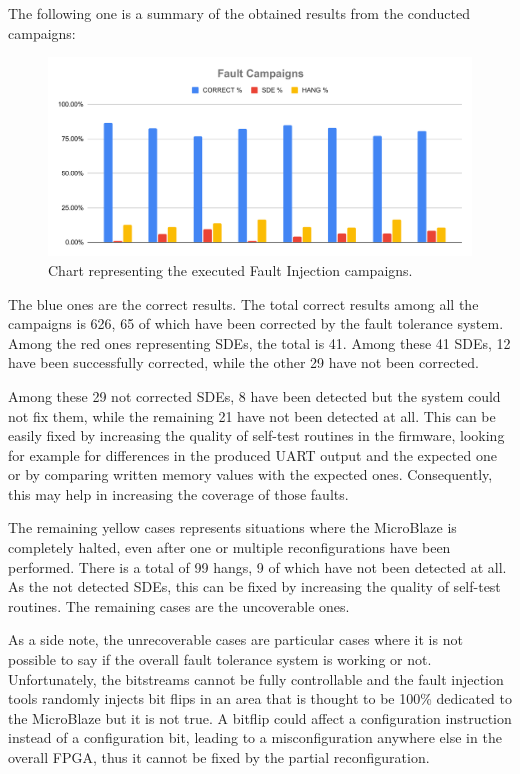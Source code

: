 The following one is a summary of the obtained results from the conducted campaigns:

\begin{figure}[H]
\centering
\includegraphics[width=0.95\linewidth]{images/chapter5/chart.pdf}
\caption{Chart representing the executed Fault Injection campaigns.}
\end{figure}

The blue ones are the correct results. The total correct results among all the campaigns is 626, 65 of which have been corrected by the fault tolerance system. Among the red ones representing SDEs, the total is 41. Among these 41 SDEs, 12 have been successfully corrected, while the other 29 have not been corrected.\bigskip

Among these 29 not corrected SDEs, 8 have been detected but the system could not fix them, while the remaining 21 have not been detected at all. This can be easily fixed by increasing the quality of self-test routines in the firmware, looking for example for differences in the produced UART output and the expected one or by comparing written memory values with the expected ones. Consequently, this may help in increasing the coverage of those faults. \bigskip

The remaining yellow cases represents situations where the MicroBlaze is completely halted, even after one or multiple reconfigurations have been performed. There is a total of 99 hangs, 9 of which have not been detected at all. As the not detected SDEs, this can be fixed by increasing the quality of self-test routines. The remaining cases are the uncoverable ones. \bigskip

As a side note, the unrecoverable cases are particular cases where it is not possible to say if the overall fault tolerance system is working or not. Unfortunately, the bitstreams cannot be fully controllable and the fault injection tools randomly injects bit flips in an area that is thought to be 100\% dedicated to the MicroBlaze but it is not true. A bitflip could affect a configuration instruction instead of a configuration bit, leading to a misconfiguration anywhere else in the overall FPGA, thus it cannot be fixed by the partial reconfiguration.

